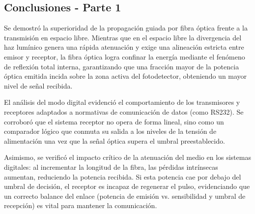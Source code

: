 \subsection{Conclusiones - Parte 1}

Se demostró la superioridad de la propagación guiada por fibra óptica frente a la transmisión en espacio libre. Mientras que en el espacio libre la divergencia del haz lumínico genera una rápida atenuación y exige una alineación estricta entre emisor y receptor, la fibra óptica logra confinar la energía mediante el fenómeno de reflexión total interna, garantizando que una fracción mayor de la potencia óptica emitida incida sobre la zona activa del fotodetector, obteniendo un mayor nivel de señal recibida.

El análisis del modo digital evidenció el comportamiento de los transmisores y receptores adaptados a normativas de comunicación de datos (como RS232). Se corroboró que el sistema receptor no opera de forma lineal, sino como un comparador lógico que conmuta su salida a los niveles de la tensión de alimentación una vez que la señal óptica supera el umbral preestablecido. 

Asimismo, se verificó el impacto crítico de la atenuación del medio en los sistemas digitales: al incrementar la longitud de la fibra, las pérdidas intrínsecas aumentan, reduciendo la potencia recibida. Si esta potencia cae por debajo del umbral de decisión, el receptor es incapaz de regenerar el pulso, evidenciando que un correcto balance del enlace (potencia de emisión vs. sensibilidad y umbral de recepción) es vital para mantener la comunicación.
